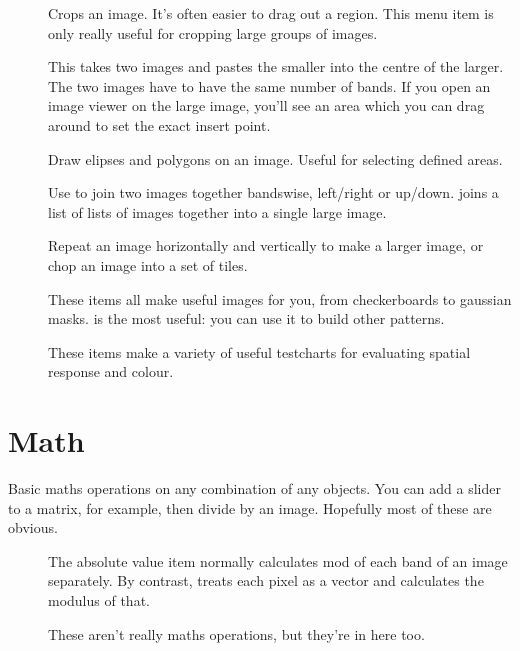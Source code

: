 \begin{description}
\item[]
	Crops an image. It's often easier to drag out a region. This menu item
	is only really useful for cropping large groups of images.

\item[]
	This takes two images and pastes the smaller into the centre of the
	larger. The two images have to have the same number of bands.
	If you open an image viewer on the large image, you'll see an area
	which you can drag around to set the exact insert point.

\item[]
	Draw elipses and polygons on an image. Useful for selecting defined
	areas.

\item[]
	Use to join two images together bandswise, left/right or up/down. 
	joins a list of lists of images together into a single large image.

\item[]
	Repeat an image horizontally and vertically to make a larger image, or
	chop an image into a set of tiles.

\item[]
	These items all make useful images for you, from checkerboards to
	gaussian masks.  is the most useful: you can use it to
	build other patterns.

\item[]
	These items make a variety of useful testcharts for evaluating
	spatial response and colour.

\end{description}

\section{Math}

Basic maths operations on any combination of any objects. You can add a slider
to a matrix, for example, then divide by an image. Hopefully most of these 
are obvious.

\begin{description}

\item[]
	The absolute value item normally calculates mod of each band of an
	image separately. By contrast,  treats
	each pixel as a vector and calculates the modulus of that.

\item[]
	These aren't really maths operations, but they're in here too.

\end{description}

